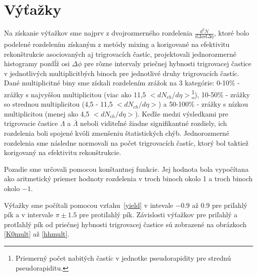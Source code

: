 \documentclass[thesismargins, thesislinespacing]{rnthesis}
\begin{document}
\section{Výťažky}

Na získanie výťažkov sme najprv z dvojrozmerného rozdelenia $\frac{d^2N}{d\Delta \phi d\Delta \eta}$, ktoré bolo podelené rozdelením získaným z metódy mixing a korigované na efektivitu rekonštrukcie asociovaných aj trigrovacích častíc, projektovali jednorozmerné histogra\-my pozdĺž osi $\Delta\phi$ pre rôzne intervaly priečnej hybnosti trigrovacej častice v jednotlivých multiplicitbých binoch pre jednotlivé druhy trigrovacích častíc. Dané multiplicitné biny sme získali rozdelením zrážok na 3 kategórie: 0-10\% - zrážky s najvyššou multiplicitou (viac ako 11,5 $<dN_{ch}/d\eta>$\footnote{Priemerný počet nabitých častíc v jednotke pseudorapidity pre strednú pseudorapiditu.}), 10-50\% - zrážky so strednou multiplicitou (4,5 - 11,5 $<dN_{ch}/d\eta>$) a 50-100\% - zrážky s nízkou multiplicitou (menej ako 4,5 $<dN_{ch}/d\eta>$). Keďže medzi  výsledkami pre trigrovacie častice $\Lambda$ a $\bar{\Lambda}$ neboli viditeľné žiadne signifikantné rozdiely, ich rozdelenia boli spojené kvôli zmenšeniu štatistických chýb. Jednorozmerné rozdelenia sme následne normovali na počet trigrovacích častíc, ktorý bol taktiež korigovaný na efektivitu rekonštrukcie. 

Pozadie sme určovali pomocou konštantnej funkcie. Jej hodnota bola vypočítana ako aritmetický priemer hodnoty rozdelenia v troch binoch okolo 1 a troch binoch okolo $-1$.  

Výťažky sme počítali pomocou vzťahu~\ref{yield} v intevale $-0.9$ až 0.9 pre priľahlý pík a v intervale $\pi\pm1.5$ pre protiľahlý pík. Závislosti výťažkov pre priľahlý a protľahlý pík od priečnej hybnosti trigrovacej častice sú zobrazené na obrázkoch \ref{K0mult} až \ref{hhmult}.
\end{document}
